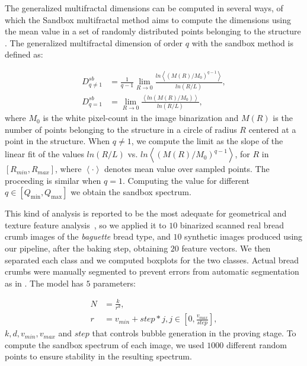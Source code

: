 \documentclass[spanish,a4paper,11pt,oneside,links]{report}
\begin{document}
The generalized multifractal dimensions can be computed in several ways, of which the Sandbox multifractal method \cite{Tel1989} aims to compute the dimensions using the mean value in a set of randomly distributed points belonging to the structure \cite{Debartolo2004}. 
The generalized multifractal dimension of order $q$ with the sandbox method is defined as:

 \begin{align*}
D_{q\ne 1}^{sb} &= \frac{1}{q-1} \lim_{R \rightarrow 0}{
\frac{ln   { \left\langle  (M(R)/M_{0})^{q-1} \right\rangle   }}
{ln {(R/L)}       }},\\
D_{q=1}^{sb} &= \lim_{R \rightarrow 0}{
\frac{ \left\langle ln   { (M(R)/M_{0})  }  \right\rangle}
{ln {(R/L)}       }},
\end{align*}
%
where $M_{0}$ is the white pixel-count in the image binarization and  $M(R)$ is the number of points belonging to the structure in a circle of radius $R$ centered at a point in the structure. 
When $q\ne1$, we compute the limit as the slope of the linear fit of the values $ln(R/L)$ vs. $ ln  \left\langle  { (M(R)/M_{0})^{q-1} }  \right\rangle$, for $R$ in $[R_{min}, R_{max}]$, where $ \left\langle \cdot  \right\rangle$ denotes mean value over sampled points. 
The proceeding is similar when $q=1$. 
Computing the value for different $q \in [Q_{\min},Q_{\max}]$  we obtain the sandbox spectrum. %

This kind of analysis is reported to be the most adequate for geometrical and texture feature analysis~\cite{Gonzales2008,Baravalle2012}, so we applied it to $10$ binarized scanned real bread crumb images of the {\em baguette} bread type, and $10$ synthetic images produced using our pipeline, after the baking step, obtaining $20$ feature vectors.
We then separated each class and we computed boxplots for the two classes.
Actual bread crumbs were manually segmented to prevent errors from automatic segmentation as in \cite{Bosch2011}.
The model has $5$ parameters:

\begin{align*}
N &= \frac{k}{r^{d}},\\ r &= v_{min}+step*j, j \in [0,\frac{v_{max}}{step}],
\end{align*}
$k,d,v_{min},v_{max}$ and $step$ that controls bubble generation in the proving stage.
To compute the sandbox spectrum of each image, we used $1000$ different random points to ensure stability in the resulting spectrum.
\end{document}
